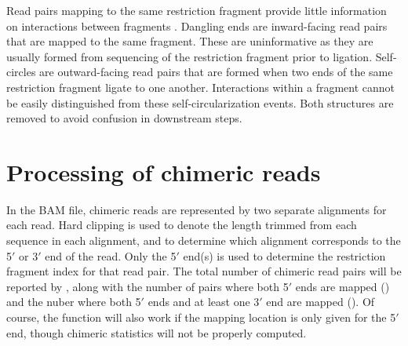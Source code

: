\documentclass{report}\usepackage[]{graphicx}\usepackage[usenames,dvipsnames]{color}
\newcommand{\hlopt}[1]{\textcolor[rgb]{0,0,0}{#1}}%
\newcommand{\hlstd}[1]{\textcolor[rgb]{0.251,0.251,0.251}{#1}}%
\newenvironment{knitrout}{}{} %
\begin{document}
Read pairs mapping to the same restriction fragment provide little information on interactions between fragments \cite{belton2012hic}.
Dangling ends are inward-facing read pairs that are mapped to the same fragment.
These are uninformative as they are usually formed from sequencing of the restriction fragment prior to ligation.
Self-circles are outward-facing read pairs that are formed when two ends of the same restriction fragment ligate to one another.
Interactions within a fragment cannot be easily distinguished from these self-circularization events.
Both structures are removed to avoid confusion in downstream steps.

\begin{knitrout}
\color{fgcolor}
\end{knitrout}

\section{Processing of chimeric reads}
In the BAM file, chimeric reads are represented by two separate alignments for each read.
Hard clipping is used to denote the length trimmed from each sequence in each alignment, and to determine which alignment corresponds to the 5$'$ or 3$'$ end of the read.
Only the 5$'$ end(s) is used to determine the restriction fragment index for that read pair.
The total number of chimeric read pairs will be reported by , along with the number of pairs where both 5$'$ ends are mapped () and the nuber where both 5$'$ ends and at least one 3$'$ end are mapped ().
Of course, the function will also work if the mapping location is only given for the 5$'$ end, though chimeric statistics will not be properly computed.

\begin{knitrout}
\color{fgcolor}
\end{knitrout}
\end{document}
